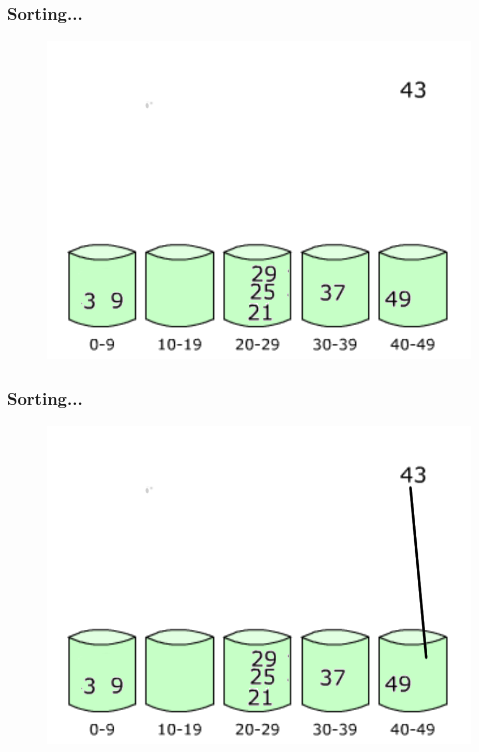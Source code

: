 \documentclass[pdf]{beamer}
\begin{document}
\begin{frame}
	\frametitle{Sorting...}
	\begin{figure}
		\includegraphics[scale=.3]{Figure/14.png}
	\end{figure}	
\end{frame}
\begin{frame}
	\frametitle{Sorting...}
	\begin{figure}
		\includegraphics[scale=.3]{Figure/15.png}
	\end{figure}	
\end{frame}
\end{document}
